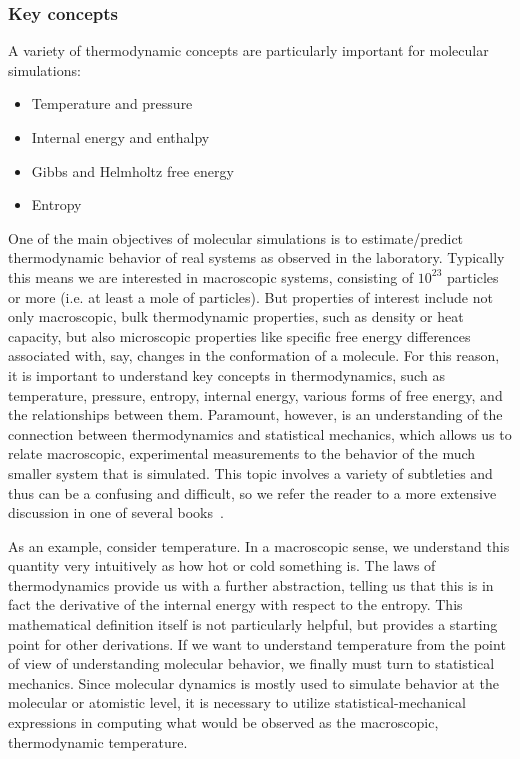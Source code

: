 \documentclass[9pt,bestpractices]{livecoms}
\begin{document}
\subsubsection{Key concepts}
A variety of thermodynamic concepts are particularly important for molecular simulations:
\begin{itemize}
\item Temperature and pressure %
\item Internal energy and enthalpy
\item Gibbs and Helmholtz free energy
\item Entropy
\end{itemize}

One of the main objectives of molecular simulations is to estimate/predict thermodynamic behavior of real systems as observed in the laboratory.
Typically this means we are interested in macroscopic systems, consisting of $10^{23}$ particles or more (i.e. at least a mole of particles). 
But properties of interest include not only macroscopic, bulk thermodynamic properties, such as density or heat capacity,
but also microscopic properties like specific free energy differences associated with, say, changes in the conformation of a molecule.
For this reason, it is important to understand key concepts in thermodynamics, such as temperature, pressure, entropy, internal energy, various forms of free energy, and the relationships between them.
Paramount, however, is an understanding of the connection between thermodynamics and statistical mechanics, which allows us to relate macroscopic, experimental measurements to the behavior of the much smaller system that is simulated.
This topic involves a variety of subtleties and thus can be a confusing and difficult, so we refer the reader to a more extensive discussion in one of several books~\cite{ShellBook, DillBook}.

As an example, consider temperature.
In a macroscopic sense, we understand this quantity very intuitively as how hot or cold something is.
The laws of thermodynamics provide us with a further abstraction, telling us that this is in fact the derivative of the internal energy with respect to the entropy.
This mathematical definition itself is not particularly helpful, but provides a starting point for other derivations.
If we want to understand temperature from the point of view of understanding molecular behavior, we finally must turn to statistical mechanics.
Since molecular dynamics is mostly used to simulate behavior at the molecular or atomistic level, it is necessary to utilize statistical-mechanical expressions in computing what would be observed as the macroscopic, thermodynamic temperature.
\end{document}
